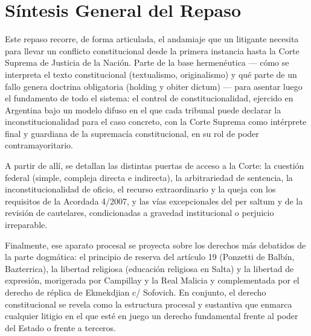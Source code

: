 \documentclass[12pt,oneside]{book}
\begin{document}
\begin{table}[H]
\begin{tabularx}{\textwidth}{
    >{\raggedright\arraybackslash}p{}
    >{\raggedright\arraybackslash}X
}
\midrule

\multicolumn{2}{p{\textwidth}}{
\textbf{Resumen:} El andamiaje procesal se proyecta sobre los derechos más debatidos de la parte dogmática: el principio de reserva del artículo 19 (Ponzetti de Balbín, Bazterrica), la libertad religiosa (educación religiosa en Salta) y la libertad de expresión, morigerada por Campillay y la Real Malicia y complementada por el derecho de réplica de Ekmekdjian c/ Sofovich.
} \\

\bottomrule
\end{tabularx}
\end{table}

\chapter*{Síntesis General del Repaso}

Este repaso recorre, de forma articulada, el andamiaje que un litigante necesita para llevar un conflicto constitucional desde la primera instancia hasta la Corte Suprema de Justicia de la Nación. Parte de la base hermenéutica --- cómo se interpreta el texto constitucional (textualismo, originalismo) y qué parte de un fallo genera doctrina obligatoria (holding y obiter dictum) --- para asentar luego el fundamento de todo el sistema: el control de constitucionalidad, ejercido en Argentina bajo un modelo difuso en el que cada tribunal puede declarar la inconstitucionalidad para el caso concreto, con la Corte Suprema como intérprete final y guardiana de la supremacía constitucional, en su rol de poder contramayoritario.

A partir de allí, se detallan las distintas puertas de acceso a la Corte: la cuestión federal (simple, compleja directa e indirecta), la arbitrariedad de sentencia, la inconstitucionalidad de oficio, el recurso extraordinario y la queja con los requisitos de la Acordada 4/2007, y las vías excepcionales del per saltum y de la revisión de cautelares, condicionadas a gravedad institucional o perjuicio irreparable.

Finalmente, ese aparato procesal se proyecta sobre los derechos más debatidos de la parte dogmática: el principio de reserva del artículo 19 (Ponzetti de Balbín, Bazterrica), la libertad religiosa (educación religiosa en Salta) y la libertad de expresión, morigerada por Campillay y la Real Malicia y complementada por el derecho de réplica de Ekmekdjian c/ Sofovich. En conjunto, el derecho constitucional se revela como la estructura procesal y sustantiva que enmarca cualquier litigio en el que esté en juego un derecho fundamental frente al poder del Estado o frente a terceros.
\end{document}
